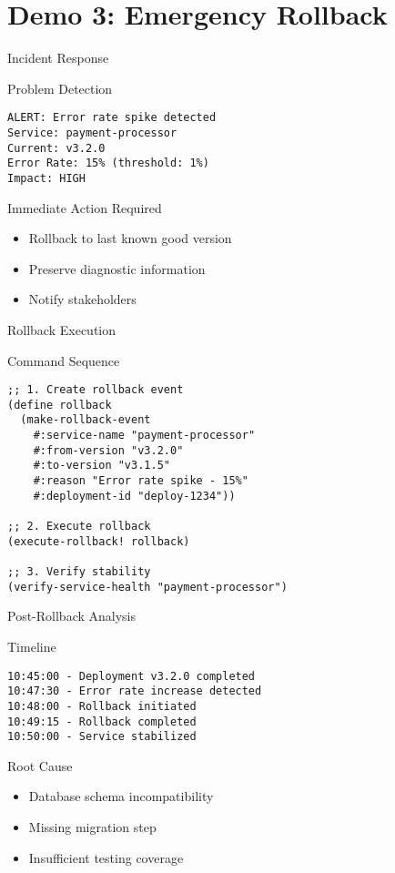 \documentclass[presentation]{beamer}
\begin{document}
\section{Demo 3: Emergency Rollback}
\label{sec:org4111c82}
\begin{frame}[label={sec:org8468080},fragile]{Incident Response}
 \begin{block}{Problem Detection}
\begin{verbatim}
ALERT: Error rate spike detected
Service: payment-processor
Current: v3.2.0
Error Rate: 15% (threshold: 1%)
Impact: HIGH
\end{verbatim}
\end{block}
\begin{block}{Immediate Action Required}
\begin{itemize}
\item Rollback to last known good version
\item Preserve diagnostic information
\item Notify stakeholders
\end{itemize}
\end{block}
\end{frame}
\begin{frame}[label={sec:org9659b9c},fragile]{Rollback Execution}
 \begin{block}{Command Sequence}
\begin{verbatim}
;; 1. Create rollback event
(define rollback
  (make-rollback-event
    #:service-name "payment-processor"
    #:from-version "v3.2.0"
    #:to-version "v3.1.5"
    #:reason "Error rate spike - 15%"
    #:deployment-id "deploy-1234"))

;; 2. Execute rollback
(execute-rollback! rollback)

;; 3. Verify stability
(verify-service-health "payment-processor")
\end{verbatim}
\end{block}
\end{frame}
\begin{frame}[label={sec:org8b937e1},fragile]{Post-Rollback Analysis}
 \begin{block}{Timeline}
\begin{verbatim}
10:45:00 - Deployment v3.2.0 completed
10:47:30 - Error rate increase detected
10:48:00 - Rollback initiated
10:49:15 - Rollback completed
10:50:00 - Service stabilized
\end{verbatim}
\end{block}
\begin{block}{Root Cause}
\begin{itemize}
\item Database schema incompatibility
\item Missing migration step
\item Insufficient testing coverage
\end{itemize}
\end{block}
\end{frame}
\end{document}
